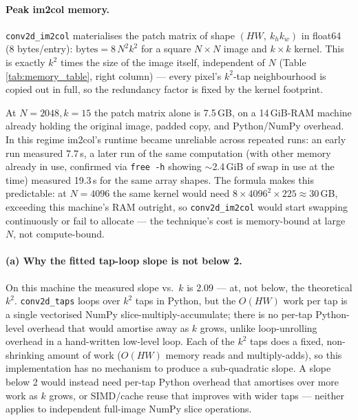 \documentclass[11pt]{article}
\begin{document}
\paragraph{Peak im2col memory.}
\texttt{conv2d\_im2col} materialises the patch matrix of shape $(HW,\ k_hk_w)$ in float64
(8 bytes/entry): $\text{bytes} = 8\,N^2 k^2$ for a square $N{\times}N$ image and $k{\times}k$
kernel. This is exactly $k^2$ times the size of the image itself, independent of $N$ (Table
\ref{tab:memory_table}, right column) --- every pixel's $k^2$-tap neighbourhood is copied out
in full, so the redundancy factor is fixed by the kernel footprint.

\begin{table}[H]
\centering

\caption{Peak im2col patch-matrix memory at $k=15$ (225 taps/pixel), by image size.}
\label{tab:memory_table}
\end{table}

At $N=2048, k=15$ the patch matrix alone is 7.5\,GB, on a 14\,GiB-RAM machine already holding the
original image, padded copy, and Python/NumPy overhead. In this regime im2col's runtime became
unreliable across repeated runs: an early run measured 7.7\,s, a later run of the same
computation (with other memory already in use, confirmed via \texttt{free -h} showing $\sim$2.4\,GiB
of swap in use at the time) measured 19.3\,s for the same array shapes. The formula makes this
predictable: at $N{=}4096$ the same kernel would need $8\times4096^2\times225 \approx 30$\,GB,
exceeding this machine's RAM outright, so \texttt{conv2d\_im2col} would start swapping
continuously or fail to allocate --- the technique's cost is memory-bound at large $N$, not
compute-bound.

\paragraph{(a) Why the fitted tap-loop slope is not below 2.}
On this machine the measured slope vs.\ $k$ is $2.09$ --- at, not below, the theoretical $k^2$.
\texttt{conv2d\_taps} loops over $k^2$ taps in Python, but the $O(HW)$ work per tap is a single
vectorised NumPy slice-multiply-accumulate; there is no per-tap Python-level overhead that would
amortise away as $k$ grows, unlike loop-unrolling overhead in a hand-written low-level loop. Each
of the $k^2$ taps does a fixed, non-shrinking amount of work ($O(HW)$ memory reads and
multiply-adds), so this implementation has no mechanism to produce a sub-quadratic slope. A slope
below 2 would instead need per-tap Python overhead that amortises over more work as $k$ grows, or
SIMD/cache reuse that improves with wider taps --- neither applies to independent full-image
NumPy slice operations.
\end{document}
